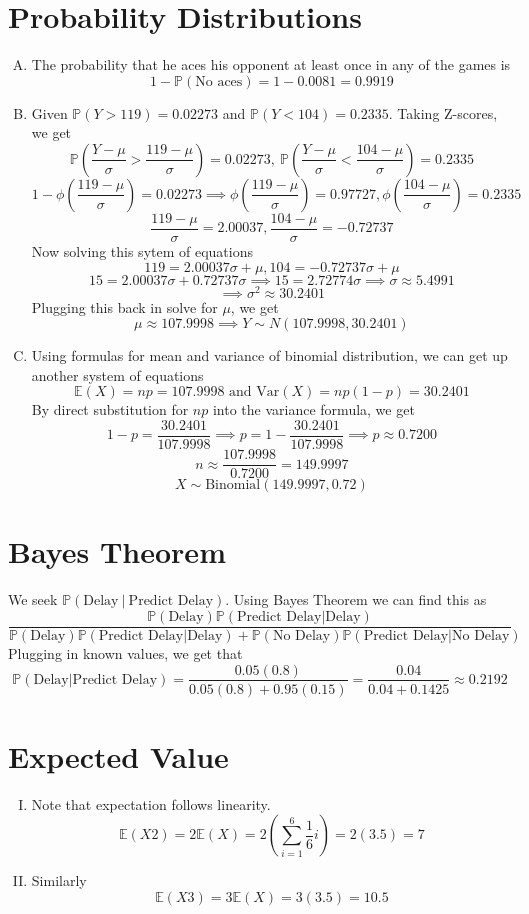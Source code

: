 \documentclass[12pt]{scrartcl}
\newcommand{\E}{\mathbb{E}}
\newcommand{\PP}{\mathbb{P}}
\newcommand{\Var}{\text{Var}}
\begin{document}
\newpage

\section{Probability Distributions}

\begin{enumerate}[A.]
  \item The probability that he aces his opponent at least once in any of the games is 
  \[1 - \PP(\text{No aces}) = 1 - 0.0081 = 0.9919\]

  \item Given $\PP(Y > 119) = 0.02273 $ and $\PP(Y < 104) = 0.2335$. Taking Z-scores, we 
  get
  \[\PP(\frac{Y - \mu}{\sigma} > \frac{119 - \mu}{\sigma}) = 0.02273, \ \PP(\frac{Y - \mu}{\sigma} < \frac{104 - \mu}{\sigma}) = 0.2335\]
  \[1 - \phi(\frac{119 - \mu}{\sigma}) = 0.02273 \implies \phi(\frac{119 - \mu}{\sigma}) = 0.97727, \phi(\frac{104 - \mu}{\sigma}) = 0.2335\]
  \[\frac{119 - \mu}{\sigma} = 2.00037, \frac{104 - \mu}{\sigma} = -0.72737\]
  Now solving this sytem of equations 
  \[119 = 2.00037\sigma + \mu, 104 = -0.72737\sigma + \mu\]
  \[15 = 2.00037\sigma + 0.72737\sigma \implies 15 = 2.72774\sigma \implies \sigma \approx 5.4991\]
  \[\implies \sigma^2 \approx 30.2401\]
  Plugging this back in solve for $\mu$, we get 
  \[\mu \approx 107.9998 \implies Y \sim N(107.9998, 30.2401)\]

  \item Using formulas for mean and variance of binomial distribution, we can get up another system of equations 
  \[\E(X) = np = 107.9998 \text{ and } \Var(X) = np(1-p) = 30.2401\]
  By direct substitution for $np$ into the variance formula, we get
  \[1-p = \frac{30.2401}{107.9998} \implies p = 1 - \frac{30.2401}{107.9998} \implies p \approx 0.7200\]
  \[n \approx \frac{107.9998}{0.7200} = 149.9997\]
  \[X \sim \text{Binomial}(149.9997, 0.72)\]
\end{enumerate}

\newpage

\section{Bayes Theorem}

We seek $\PP(\text{Delay} \ | \ \text{Predict Delay})$. Using Bayes Theorem
we can find this as 
\[\dfrac{\PP(\text{Delay})\PP(\text{Predict Delay} | \text{Delay})}{\PP(\text{Delay})\PP(\text{Predict Delay} | \text{Delay}) + \PP(\text{No Delay})\PP(\text{Predict Delay} | \text{No Delay})}\]
Plugging in known values, we get that 
\[\PP(\text{Delay} | \text{Predict Delay}) = \dfrac{0.05(0.8)}{0.05(0.8) + 0.95(0.15)} = \frac{0.04}{0.04 + 0.1425} \approx 0.2192\]

\newpage

\section{Expected Value}

\begin{enumerate}[I.]
  \item Note that expectation follows linearity.
  \[\E(X2) = 2\E(X) = 2(\sum_{i=1}^6 \frac{1}{6}i) = 2(3.5) = 7\]
  \item Similarly
  \[\E(X3) = 3\E(X) = 3(3.5) = 10.5\]
\end{enumerate}
\end{document}
